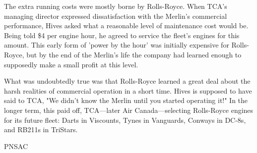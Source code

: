 The extra running costs were mostly borne by Rolls-Royce. When TCA's managing
director expressed dissatisfaction with the Merlin's commercial performance,
Hives asked what a reasonable level of maintenance cost would be. Being told
\$4 per engine hour, he agreed to service the fleet's engines for this amount.
This early form of 'power by the hour' was initially expensive for Rolls-Royce,
but by the end of the Merlin's life the company had learned enough to
supposedly make a small profit at this level.

What was undoubtedly true was that Rolls-Royce learned a great deal about the
harsh realities of commercial operation in a short time. Hives is supposed to
have said to TCA, "We didn't know the Merlin until you started operating it!"
In the longer term, this paid off, TCA---later Air Canada---selecting
Rolls-Royce engines for its future fleet: Darts in Viscounts, Tynes in
Vanguards, Conways in DC-8s, and RB211s in TriStars.

\begin{footnotesize}
  \raggedleft PNSAC\\
\end{footnotesize}



